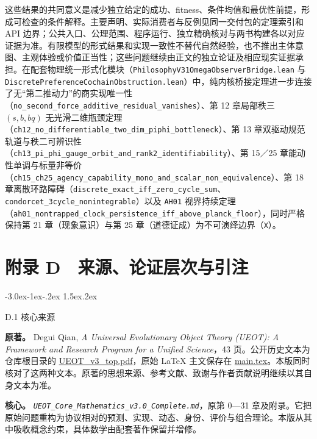 \documentclass[
  11pt,
  oneside]{book}
\makeatletter
\renewcommand\section{\@startsection{section}{1}{\z@}%
  {-3.0ex\@plus-1ex\@minus-.2ex}%
  {1.5ex\@plus.2ex}%
  {\normalfont\Large\bfseries\raggedright\hyphenpenalty=10000\exhyphenpenalty=10000}}
\makeatother
\begin{document}
这些结果的共同意义是减少独立给定的成功、fitness、条件均值和最优性前提，形成可检查的条件解释。主要声明、实际消费者与反例见同一交付包的定理索引和 API 边界；公共入口、公理范围、程序运行、独立精确核对与两书构建各以对应证据为准。有限模型的形式结果和实现一致性不替代自然经验，也不推出主体意图、主观体验或价值正当性；这些问题继续由正文的独立论证及相应现实证据承担。在配套物理统一形式化模块（\nolinkurl{PhilosophyV31OmegaObserverBridge.lean} 与 \nolinkurl{DiscretePreferenceCochainObstruction.lean}）中，纯内核桥接定理进一步连接了无``第二推动力''的商实现唯一性（\nolinkurl{no_second_force_additive_residual_vanishes}）、第 12 章局部秩三 \((s,b,bq)\) 无光滑二维瓶颈定理（\nolinkurl{ch12_no_differentiable_two_dim_piphi_bottleneck}）、第 13 章双驱动规范轨道与秩二可辨识性（\nolinkurl{ch13_pi_phi_gauge_orbit_and_rank2_identifiability}）、第 15／25 章能动性单调与标量非等价（\nolinkurl{ch15_ch25_agency_capability_mono_and_scalar_non_equivalence}）、第 18 章离散环路障碍（\nolinkurl{discrete_exact_iff_zero_cycle_sum}、\nolinkurl{condorcet_3cycle_nonintegrable}）以及 \texttt{AH01} 视界持续定理（\nolinkurl{ah01_nontrapped_clock_persistence_iff_above_planck_floor}），同时严格保持第 21 章（现象意识）与第 25 章（道德证成）为不可演绎边界（\texttt{X}）。

\chapter{附录 D　来源、论证层次与引注}\label{ph-app-d}

\section{D.1 核心来源}\label{ph-d-1}

\textbf{原著。} Degui Qian, \emph{A Universal Evolutionary Object Theory (UEOT): A Framework and Research Program for a Unified Science}，43 页。公开历史文本为仓库根目录的 \href{https://github.com/MurphyHoops/UEOT/blob/3d443ec29eb17af1fc00699a74e2d42d73516d81/UEOT_v3_top.pdf}{UEOT\_v3\_top.pdf}，原始 LaTeX 主文保存在 \href{https://github.com/MurphyHoops/UEOT/blob/3d443ec29eb17af1fc00699a74e2d42d73516d81/philosophy/source/original/main.tex}{main.tex}。本版同时核对了这两种文本。原著的思想来源、参考文献、致谢与作者贡献说明继续以其自身文本为准。

\textbf{核心。} \emph{\nolinkurl{UEOT_Core_Mathematics_v3.0_Complete.md}}，原第 0---31 章及附录。它把原始问题重构为协议相对的预测、实现、动态、身份、评价与组合理论。本版从其中吸收概念约束，具体数学由配套著作保留并增修。
\end{document}
